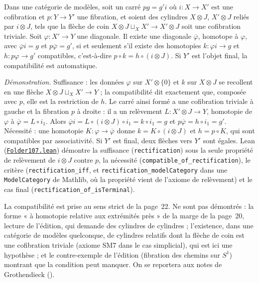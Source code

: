 \begin{encadre}
\begin{theoreme*}
Dans une catégorie de modèles, soit un carré $pg = g'i$ où $i : X \to X'$ est une cofibration et $p : Y \to Y'$ une fibration, et soient des cylindres $X \otimes J$, $X' \otimes J$ reliés par $i \otimes J$, tels que la flèche de coin $X \otimes J \sqcup_X X' \to X' \otimes J$ soit une cofibration triviale. Soit $\varphi : X' \to Y$ une diagonale. Il existe une diagonale $\overline{\varphi}$, homotope à $\varphi$, avec $\overline{\varphi} i = g$ et $p\overline{\varphi} = g'$, si et seulement s'il existe des homotopies $k : \varphi i \to g$ et $h : p\varphi \to g'$ compatibles, c'est-à-dire $p \circ k = h \circ (i \otimes J)$. Si $Y'$ est l'objet final, la compatibilité est automatique.
\end{theoreme*}
\end{encadre}
{\small \emph{Démonstration.} Suffisance : les données $\varphi$ sur $X' \otimes \{0\}$ et $k$ sur $X \otimes J$ se recollent en une flèche $X \otimes J \sqcup_X X' \to Y$ ; la compatibilité dit exactement que, composée avec $p$, elle est la restriction de $h$. Le carré ainsi formé a une cofibration triviale à gauche et la fibration $p$ à droite : il a un relèvement $L : X' \otimes J \to Y$, homotopie de $\varphi$ à $\overline{\varphi} = L \circ i_1$. Alors $\overline{\varphi} i = L \circ (i \otimes J) \circ i_1 = k \circ i_1 = g$ et $p\overline{\varphi} = h \circ i_1 = g'$. Nécessité : une homotopie $K : \varphi \to \overline{\varphi}$ donne $k = K \circ (i \otimes J)$ et $h = p \circ K$, qui sont compatibles par associativité. Si $Y'$ est final, deux flèches vers $Y'$ sont égales. Lean (\href{\leanblob/CategoryTheory/Folder107.lean}{\texttt{Folder107.\allowbreak{}lean}}) démontre la suffisance (\texttt{rectification}) sous la seule propriété de relèvement de $i \otimes J$ contre $p$, la nécessité (\texttt{compatible\_of\_rectification}), le critère (\texttt{rectification\_iff}, et \texttt{rectification\_modelCategory} dans une \texttt{ModelCategory} de Mathlib, où la propriété vient de l'axiome de relèvement) et le cas final (\texttt{rectification\_of\_isTerminal}).\par}
{\small La compatibilité est prise au sens strict de la page~22. Ne sont pas démontrés : la forme « à homotopie relative aux extrémités près » de la marge de la page~20, lecture de l'édition, qui demande des cylindres de cylindres ; l'existence, dans une catégorie de modèles quelconque, de cylindres relatifs dont la flèche de coin est une cofibration triviale (axiome SM7 dans le cas simplicial), qui est ici une hypothèse ; et le contre-exemple de l'édition (fibration des chemins sur $S^1$) montrant que la condition peut manquer. On se reportera aux notes de Grothendieck ().\par}

